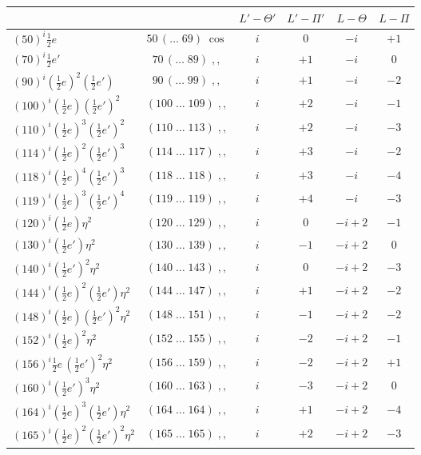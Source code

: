 \documentclass[11pt]{article}
\begin{document}
\begin{center}
\begin{tabular}{|l|c|c|c|c|c|}
\hline
 & & $L'-\Theta'$ & $L'-\Pi'$ & $L-\Theta$ & $L-\Pi$ \\
\hline
$(50)^i\tfrac{1}{2}e$ & $50\,(\ldots\;69)\;\cos$ & $i$ & $0$ & $-i$ & $+1$ \\
$(70)^i\tfrac{1}{2}e'$ & $70\,(\ldots\;89)\;,,$ & $i$ & $+1$ & $-i$ & $0$ \\
$(90)^i(\tfrac{1}{2}e)^2(\tfrac{1}{2}e')$ & $90\,(\ldots\;99)\;,,$ & $i$ & $+1$ & $-i$ & $-2$ \\
$(100)^i(\tfrac{1}{2}e)(\tfrac{1}{2}e')^2$ & $(100\;\ldots\;109)\;,,$ & $i$ & $+2$ & $-i$ & $-1$ \\
$(110)^i(\tfrac{1}{2}e)^3(\tfrac{1}{2}e')^2$ & $(110\;\ldots\;113)\;,,$ & $i$ & $+2$ & $-i$ & $-3$ \\
$(114)^i(\tfrac{1}{2}e)^2(\tfrac{1}{2}e')^3$ & $(114\;\ldots\;117)\;,,$ & $i$ & $+3$ & $-i$ & $-2$ \\
$(118)^i(\tfrac{1}{2}e)^4(\tfrac{1}{2}e')^3$ & $(118\;\ldots\;118)\;,,$ & $i$ & $+3$ & $-i$ & $-4$ \\
$(119)^i(\tfrac{1}{2}e)^3(\tfrac{1}{2}e')^4$ & $(119\;\ldots\;119)\;,,$ & $i$ & $+4$ & $-i$ & $-3$ \\
$(120)^i(\tfrac{1}{2}e)\eta^2$ & $(120\;\ldots\;129)\;,,$ & $i$ & $0$ & $-i+2$ & $-1$ \\
$(130)^i(\tfrac{1}{2}e')\eta^2$ & $(130\;\ldots\;139)\;,,$ & $i$ & $-1$ & $-i+2$ & $0$ \\
$(140)^i(\tfrac{1}{2}e')^2\eta^2$ & $(140\;\ldots\;143)\;,,$ & $i$ & $0$ & $-i+2$ & $-3$ \\
$(144)^i(\tfrac{1}{2}e)^2(\tfrac{1}{2}e')\eta^2$ & $(144\;\ldots\;147)\;,,$ & $i$ & $+1$ & $-i+2$ & $-2$ \\
$(148)^i(\tfrac{1}{2}e)(\tfrac{1}{2}e')^2\eta^2$ & $(148\;\ldots\;151)\;,,$ & $i$ & $-1$ & $-i+2$ & $-2$ \\
$(152)^i(\tfrac{1}{2}e)^2\eta^2$ & $(152\;\ldots\;155)\;,,$ & $i$ & $-2$ & $-i+2$ & $-1$ \\
$(156)^i\tfrac{1}{2}e\,(\tfrac{1}{2}e')^2\eta^2$ & $(156\;\ldots\;159)\;,,$ & $i$ & $-2$ & $-i+2$ & $+1$ \\
$(160)^i(\tfrac{1}{2}e')^3\eta^2$ & $(160\;\ldots\;163)\;,,$ & $i$ & $-3$ & $-i+2$ & $0$ \\
$(164)^i(\tfrac{1}{2}e)^3(\tfrac{1}{2}e')\eta^2$ & $(164\;\ldots\;164)\;,,$ & $i$ & $+1$ & $-i+2$ & $-4$ \\
$(165)^i(\tfrac{1}{2}e)^2(\tfrac{1}{2}e')^2\eta^2$ & $(165\;\ldots\;165)\;,,$ & $i$ & $+2$ & $-i+2$ & $-3$ \\

\end{tabular}
\end{center}
\end{document}

